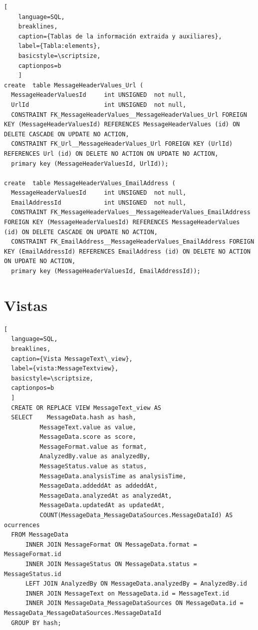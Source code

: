 \begin{lstlisting}[
    language=SQL,
    breaklines, 
    caption={Tablas de la información extraida y auxiliares}, 
    label={Tabla:elements}, 
    basicstyle=\scriptsize,
    captionpos=b
    ]
create  table MessageHeaderValues_Url (
  MessageHeaderValuesId     int UNSIGNED  not null, 
  UrlId                     int UNSIGNED  not null,
  CONSTRAINT FK_MessageHeaderValues__MessageHeaderValues_Url FOREIGN KEY (MessageHeaderValuesId) REFERENCES MessageHeaderValues (id) ON DELETE CASCADE ON UPDATE NO ACTION,
  CONSTRAINT FK_Url__MessageHeaderValues_Url FOREIGN KEY (UrlId) REFERENCES Url (id) ON DELETE NO ACTION ON UPDATE NO ACTION,
  primary key (MessageHeaderValuesId, UrlId));

create  table MessageHeaderValues_EmailAddress (
  MessageHeaderValuesId     int UNSIGNED  not null, 
  EmailAddressId            int UNSIGNED  not null,
  CONSTRAINT FK_MessageHeaderValues__MessageHeaderValues_EmailAddress FOREIGN KEY (MessageHeaderValuesId) REFERENCES MessageHeaderValues (id) ON DELETE CASCADE ON UPDATE NO ACTION,
  CONSTRAINT FK_EmailAddress__MessageHeaderValues_EmailAddress FOREIGN KEY (EmailAddressId) REFERENCES EmailAddress (id) ON DELETE NO ACTION ON UPDATE NO ACTION,
  primary key (MessageHeaderValuesId, EmailAddressId));
\end{lstlisting}

\section{Vistas}
\renewcommand{\lstlistingname}{Vista}%

\begin{lstlisting}[
  language=SQL,
  breaklines, 
  caption={Vista MessageText\_view}, 
  label={vista:MessageTextview}, 
  basicstyle=\scriptsize,
  captionpos=b
  ]
  CREATE OR REPLACE VIEW MessageText_view AS 
  SELECT	MessageData.hash as hash, 
          MessageText.value as value, 
          MessageData.score as score, 
          MessageFormat.value as format, 
          AnalyzedBy.value as analyzedBy, 
          MessageStatus.value as status, 
          MessageData.analysisTime as analysisTime, 
          MessageData.addeddAt as addeddAt, 
          MessageData.analyzedAt as analyzedAt, 
          MessageData.updatedAt as updatedAt,
          COUNT(MessageData_MessageDataSources.MessageDataId) AS ocurrences 
  FROM MessageData 
      INNER JOIN MessageFormat ON MessageData.format = MessageFormat.id
      INNER JOIN MessageStatus ON MessageData.status = MessageStatus.id
      LEFT JOIN AnalyzedBy ON MessageData.analyzedBy = AnalyzedBy.id
      INNER JOIN MessageText on MessageData.id = MessageText.id
      INNER JOIN MessageData_MessageDataSources ON MessageData.id = MessageData_MessageDataSources.MessageDataId
  GROUP BY hash;
\end{lstlisting}

